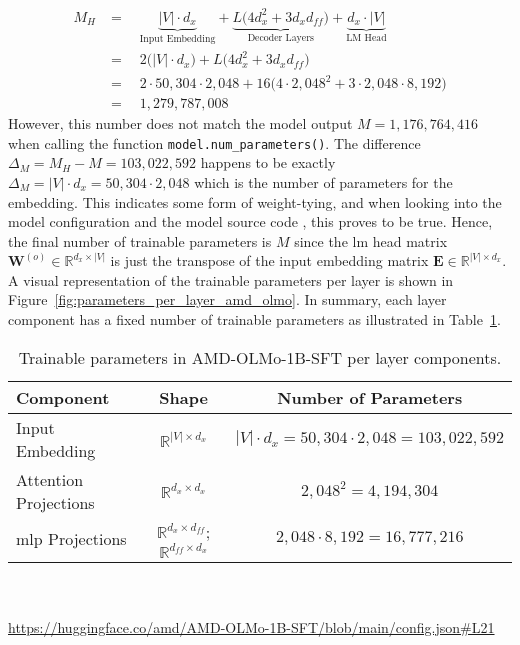 \begin{align*}
    M_H &=\quad \underbrace{|V| \cdot d_x}_{\text{Input Embedding}} 
    + \underbrace{L \big( 4 d_x^2 + 3 d_x d_{ff} \big)}_{\text{Decoder Layers}}
    + \underbrace{d_x \cdot |V|}_{\text{LM Head}} \\
    &=\quad 2 \bigl( |V| \cdot d_x \bigr)
    + L \big( 4 d_x^2 + 3 d_x d_{ff} \big) \\
    &=\quad 2 \cdot 50{,}304 \cdot 2{,}048 + 16 \bigl(4 \cdot 2{,}048^2 + 3 \cdot 2{,}048 \cdot 8{,}192 \bigr) \\
    &=\quad 1{,}279{,}787{,}008
\end{align*}
However, this number does not match the model output $M = 1{,}176{,}764{,}416$ when calling the function \texttt{model.num\_parameters()}. The difference $\Delta_M = M_H - M = 103{,}022{,}592$ happens to be exactly $\Delta_M = |V| \cdot d_x = 50{,}304 \cdot 2{,}048$ which is the number of parameters for the embedding. This indicates some form of weight-tying, and when looking into the model configuration and the model source code \cite{Groeneveld2023OLMo}, this proves to be true. Hence, the final number of trainable parameters is $M$ since the \acrshort{lm} head matrix $\mathbf{W}^{(o)} \in \mathbb{R}^{d_x \times |V|}$ is just the transpose of the input embedding matrix $\mathbf{E} \in \mathbb{R}^{|V| \times d_x}$. A visual representation of the trainable parameters per layer is shown in Figure~\ref{fig:parameters_per_layer_amd_olmo}. In summary, each layer component has a fixed number of trainable parameters as illustrated in Table~\ref{tab:parameter_components_olmo}.
\begin{table}[htb]
    \centering
    \begin{tabular}{|l|c|c|}
        \hline
        \textbf{Component} & \textbf{Shape} & \textbf{Number of Parameters} \\
        \hline
        Input Embedding & $\mathbb{R}^{|V| \times d_x}$ & $|V| \cdot d_x = 50{,}304 \cdot 2{,}048 = 103{,}022{,}592$ \\
        Attention Projections & $\mathbb{R}^{d_x \times d_x}$ & $2{,}048^2 = 4{,}194{,}304$ \\
        \acrshort{mlp} Projections & $\mathbb{R}^{d_x \times d_{ff}}$; $\mathbb{R}^{d_{ff} \times d_x}$ & $2{,}048 \cdot 8{,}192 = 16{,}777{,}216$ \\
        \hline
    \end{tabular}
    \caption{Trainable parameters in AMD-OLMo-1B-SFT per layer components.}
    \label{tab:parameter_components_olmo}
\end{table}
\\\\
\url{https://huggingface.co/amd/AMD-OLMo-1B-SFT/blob/main/config.json#L21}

